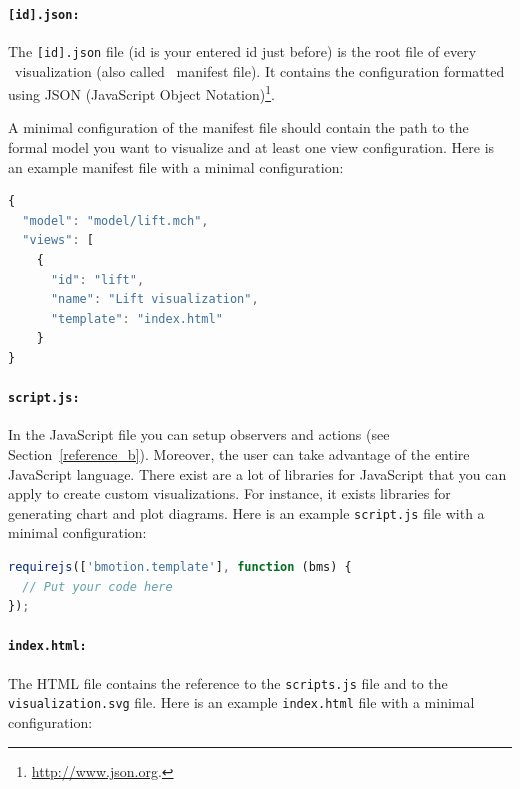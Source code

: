 \paragraph{\texttt{[id].json:}}
The \texttt{[id].json} file (id is your entered id just before) is the root file of every \bms\ visualization (also called \bms\ manifest file).
It contains the configuration formatted using JSON (JavaScript Object Notation)\footnote{\url{http://www.json.org}.}.


A minimal configuration of the manifest file should contain the path to the formal model you want to visualize and at least one view configuration.
Here is an example manifest file with a minimal configuration:

\begin{lstlisting}[language=JavaScript]
{
  "model": "model/lift.mch",
  "views": [
    {
      "id": "lift",
      "name": "Lift visualization",
      "template": "index.html"
    }
}
\end{lstlisting}


\paragraph{\texttt{script.js:}}
In the JavaScript file you can setup observers and actions (see Section~\ref{reference_b}).
Moreover, the user can take advantage of the entire JavaScript language.
There exist are a lot of libraries for JavaScript that you can apply to create custom visualizations.
For instance, it exists libraries for generating chart and plot diagrams.
Here is an example \texttt{script.js} file with a minimal configuration:

\begin{lstlisting}[language=JavaScript]
requirejs(['bmotion.template'], function (bms) {
  // Put your code here
});
\end{lstlisting}


\paragraph{\texttt{index.html:}}
The HTML file contains the reference to the \texttt{scripts.js} file and to the \texttt{visualization.svg} file.
Here is an example \texttt{index.html} file with a minimal configuration:

